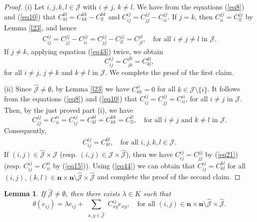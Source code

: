 \documentclass[reqno]{amsart}
\theoremstyle{plain}
\newtheorem{lemma}[theorem]{Lemma}
\theoremstyle{definition}
\begin{document}
\begin{proof}
(i) Let $i,j,k,l\in \mathcal{J}$ with $i\neq j $, $k\neq l$.
We have from the equations (\ref{eq8}) and (\ref{eq10})
that $C_{kl}^{kl} = C_{kk}^{kk} - C_{ll}^{kk}$ and  $C_{ij}^{ij} = C_{jj}^{jj} - C_{ii}^{jj}$.
If $j = k$, then $C_{ii}^{jj}=C_{ll}^{jj}$ by Lemma \ref{l23}, and hence
 \begin{align}\label{eq43}
C_{ij}^{ij} = C_{jj}^{jj} - C_{ii}^{jj} = C_{jj}^{jj} - C_{ll}^{jj} = C_{jl}^{jl}, 
\quad \text{for all } i \neq j   \neq l \text{ in } \mathcal{J}.
 \end{align}
If $j \neq k$, applying equation (\ref {eq43}) twice, we obtain
\[
C_{ij}^{ij} = C_{jk}^{jk} = C_{kl}^{kl},
\]
for all $ i \neq j $, $ j \neq k $ and $ k \neq l $ in $\mathcal{J}$. We complete the proof of the first claim.

(ii) Since $\hat{\mathcal{J}} \neq \emptyset $, by Lemma \ref{l23} we have $ C_{kk}^{ii} = 0 $ for all
$k \in \mathcal{J} \setminus \{i\}$. It follows from the
equations (\ref{eq8}) and (\ref{eq10}) that
$C_{ij}^{ij} = C_{jj}^{jj} = C_{ii}^{ii}$, for all $i\neq j$ in $\mathcal{J}$.
Then, by the just proved part (i), we have
\[
C_{jj}^{jj} = C_{ii}^{ii} =C_{ij}^{ij} = C_{kl}^{kl}=C_{kk}^{kk}=C_{ll}^{ll}, \quad \text{for all } i \neq j \text{ and } k \neq l \text{ in } \mathcal{J}.
\]
Consequently,
\begin{align}\label{eq44}
C_{ij}^{ij} = C_{kl}^{kl}, \quad \text{for all }  i,j,k,l \in \mathcal{J}.
\end{align}
If $ (i,j) \in \hat{\mathcal{J}} \times \mathcal{J} $ (resp. $ (i,j) \in \mathcal{J} \times \hat{\mathcal{J}} $), then we have $ C_{ij}^{ij} = C_{jj}^{jj}$ by (\ref{eq21})
(resp. $ C_{ij}^{ij} = C_{ii}^{ii} $ by (\ref{eq15})).
Using (\ref{eq44}) we can obtain that $ C_{ij}^{ij} = C_{kl}^{kl} $ for all $ (i,j), (k,l)\in \mathbf{n} \times \mathbf{n} \setminus \hat{\mathcal{J}} \times \hat{\mathcal{J}}$
 and complete the proof of the second claim.
\end{proof}

\begin{lemma}\label{l28}
If $ \hat{\mathcal{J}} \neq \emptyset $, then there exists $ \lambda \in K $ such that
$$ \theta(e_{ij}) = \lambda e_{ij} + \sum_{\substack{x,y \in \hat{\mathcal{J}}}} C_{xy}^{ij} e_{xy},
\quad \text{for all }  (i,j)  \in \mathbf{n} \times \mathbf{n} \setminus \hat{\mathcal{J}} \times \hat{\mathcal{J}}.$$
\end{lemma}
\end{document}
